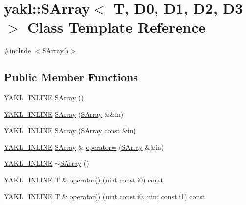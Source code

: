 \hypertarget{classyakl_1_1SArray}{}\section{yakl\+:\+:S\+Array$<$ T, D0, D1, D2, D3 $>$ Class Template Reference}
\label{classyakl_1_1SArray}


{\ttfamily \#include $<$S\+Array.\+h$>$}

\subsection*{Public Member Functions}
\begin{DoxyCompactItemize}
\item 
\hyperlink{YAKL_8h_aa0dd629ffce6d564b19e9313fb91a5ad}{Y\+A\+K\+L\+\_\+\+I\+N\+L\+I\+NE} \hyperlink{classyakl_1_1SArray_aa085eb4d1db8000c7460ff7d4ca7e77a}{S\+Array} ()
\item 
\hyperlink{YAKL_8h_aa0dd629ffce6d564b19e9313fb91a5ad}{Y\+A\+K\+L\+\_\+\+I\+N\+L\+I\+NE} \hyperlink{classyakl_1_1SArray_ab4161adb9402e19cc7389cd2927bf7b4}{S\+Array} (\hyperlink{classyakl_1_1SArray}{S\+Array} \&\&in)
\item 
\hyperlink{YAKL_8h_aa0dd629ffce6d564b19e9313fb91a5ad}{Y\+A\+K\+L\+\_\+\+I\+N\+L\+I\+NE} \hyperlink{classyakl_1_1SArray_a3bc07e4bb8981cc1f234648eb7273391}{S\+Array} (\hyperlink{classyakl_1_1SArray}{S\+Array} const \&in)
\item 
\hyperlink{YAKL_8h_aa0dd629ffce6d564b19e9313fb91a5ad}{Y\+A\+K\+L\+\_\+\+I\+N\+L\+I\+NE} \hyperlink{classyakl_1_1SArray}{S\+Array} \& \hyperlink{classyakl_1_1SArray_a717dab561738aba2c2a7bb864104673a}{operator=} (\hyperlink{classyakl_1_1SArray}{S\+Array} \&\&in)
\item 
\hyperlink{YAKL_8h_aa0dd629ffce6d564b19e9313fb91a5ad}{Y\+A\+K\+L\+\_\+\+I\+N\+L\+I\+NE} \hyperlink{classyakl_1_1SArray_a9a56c60f5221fa10bd6213df8a115550}{$\sim$\+S\+Array} ()
\item 
\hyperlink{YAKL_8h_aa0dd629ffce6d564b19e9313fb91a5ad}{Y\+A\+K\+L\+\_\+\+I\+N\+L\+I\+NE} T \& \hyperlink{classyakl_1_1SArray_a49eae1a54740b7adffe54c0832ab1f21}{operator()} (\hyperlink{classyakl_1_1SArray_a777ad93441c16e786309b27e40bc56f0}{uint} const i0) const
\item 
\hyperlink{YAKL_8h_aa0dd629ffce6d564b19e9313fb91a5ad}{Y\+A\+K\+L\+\_\+\+I\+N\+L\+I\+NE} T \& \hyperlink{classyakl_1_1SArray_a1d4b5858b6c36e636cb4abf26deefa92}{operator()} (\hyperlink{classyakl_1_1SArray_a777ad93441c16e786309b27e40bc56f0}{uint} const i0, \hyperlink{classyakl_1_1SArray_a777ad93441c16e786309b27e40bc56f0}{uint} const i1) const

\end{DoxyCompactItemize}
